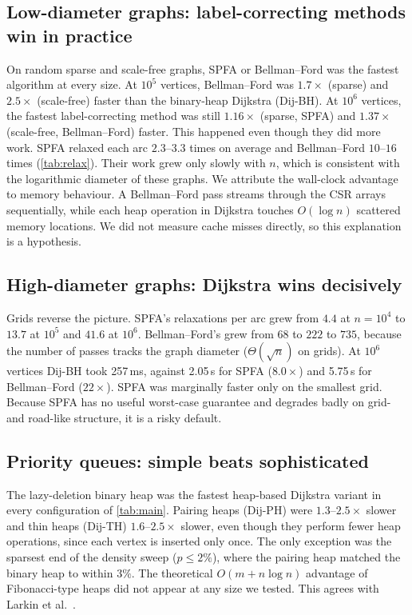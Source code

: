 \documentclass[conference]{IEEEtran}
\begin{document}
\begin{table}[t]
\centering
\caption{Mean edge relaxations per arc (machine-independent work).}
\label{tab:relax}
\footnotesize

\end{table}

\subsection{Low-diameter graphs: label-correcting methods win in practice}
On random sparse and scale-free graphs, SPFA or Bellman--Ford was the fastest
algorithm at every size. At $10^5$ vertices, Bellman--Ford was $1.7\times$
(sparse) and $2.5\times$ (scale-free) faster than the binary-heap Dijkstra
(Dij-BH). At $10^6$ vertices, the fastest label-correcting method was still
$1.16\times$ (sparse, SPFA) and $1.37\times$ (scale-free, Bellman--Ford)
faster. This
happened even though they did more work. SPFA relaxed each arc $2.3$--$3.3$
times on average and Bellman--Ford $10$--$16$ times
(\cref{tab:relax}). Their work grew only slowly with $n$, which is consistent
with the logarithmic diameter of these graphs. We attribute the wall-clock
advantage to memory behaviour. A Bellman--Ford pass streams through the CSR
arrays sequentially, while each heap operation in Dijkstra touches
$O(\log n)$ scattered memory locations. We did not measure cache misses
directly, so this explanation is a hypothesis.

\subsection{High-diameter graphs: Dijkstra wins decisively}
Grids reverse the picture. SPFA's relaxations per arc grew from $4.4$ at
$n=10^4$ to $13.7$ at $10^5$ and $41.6$ at $10^6$. Bellman--Ford's grew from
$68$ to $222$ to $735$, because the number of passes tracks the graph diameter
($\Theta(\sqrt n)$ on grids). At $10^6$ vertices Dij-BH took 257\,ms, against
2.05\,s for SPFA ($8.0\times$) and 5.75\,s for Bellman--Ford ($22\times$).
SPFA was marginally faster only on the smallest grid. Because SPFA has no
useful worst-case guarantee and degrades badly on grid- and road-like
structure, it is a risky default.

\subsection{Priority queues: simple beats sophisticated}
The lazy-deletion binary heap was the fastest heap-based Dijkstra variant in
every configuration of \cref{tab:main}. Pairing heaps (Dij-PH) were
$1.3$--$2.5\times$ slower and thin heaps (Dij-TH) $1.6$--$2.5\times$ slower,
even though they perform fewer heap operations, since each vertex is inserted
only once. The only exception was the sparsest end of the density sweep
($p\le2\%$), where the pairing heap matched the binary heap to within
$3\%$. The theoretical
$O(m + n\log n)$ advantage of Fibonacci-type heaps did not appear at any size
we tested. This agrees with Larkin et al.~\cite{larkin2014}.
\end{document}
